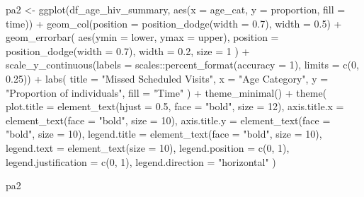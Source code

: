 \documentclass[
  letterpaper,
  DIV=11,
  numbers=noendperiod]{scrartcl}
\newenvironment{Shaded}{\begin{snugshade}}{\end{snugshade}}
\newcommand{\AttributeTok}[1]{\textcolor[rgb]{0.40,0.45,0.13}{#1}}
\newcommand{\DecValTok}[1]{\textcolor[rgb]{0.68,0.00,0.00}{#1}}
\newcommand{\FloatTok}[1]{\textcolor[rgb]{0.68,0.00,0.00}{#1}}
\newcommand{\FunctionTok}[1]{\textcolor[rgb]{0.28,0.35,0.67}{#1}}
\newcommand{\NormalTok}[1]{\textcolor[rgb]{0.00,0.23,0.31}{#1}}
\newcommand{\OtherTok}[1]{\textcolor[rgb]{0.00,0.23,0.31}{#1}}
\newcommand{\SpecialCharTok}[1]{\textcolor[rgb]{0.37,0.37,0.37}{#1}}
\newcommand{\StringTok}[1]{\textcolor[rgb]{0.13,0.47,0.30}{#1}}
\begin{document}
\begin{Shaded}
\begin{Highlighting}[]
\NormalTok{pa2 }\OtherTok{\textless{}{-}} \FunctionTok{ggplot}\NormalTok{(df\_age\_hiv\_summary, }\FunctionTok{aes}\NormalTok{(}\AttributeTok{x =}\NormalTok{ age\_cat, }\AttributeTok{y =}\NormalTok{ proportion, }\AttributeTok{fill =}\NormalTok{ time)) }\SpecialCharTok{+}
  \FunctionTok{geom\_col}\NormalTok{(}\AttributeTok{position =} \FunctionTok{position\_dodge}\NormalTok{(}\AttributeTok{width =} \FloatTok{0.7}\NormalTok{), }\AttributeTok{width =} \FloatTok{0.5}\NormalTok{) }\SpecialCharTok{+}
  \FunctionTok{geom\_errorbar}\NormalTok{(}
    \FunctionTok{aes}\NormalTok{(}\AttributeTok{ymin =}\NormalTok{ lower, }\AttributeTok{ymax =}\NormalTok{ upper),}
    \AttributeTok{position =} \FunctionTok{position\_dodge}\NormalTok{(}\AttributeTok{width =} \FloatTok{0.7}\NormalTok{),}
    \AttributeTok{width =} \FloatTok{0.2}\NormalTok{,}
    \AttributeTok{size =} \DecValTok{1}
\NormalTok{  ) }\SpecialCharTok{+}
  \FunctionTok{scale\_y\_continuous}\NormalTok{(}\AttributeTok{labels =}\NormalTok{ scales}\SpecialCharTok{::}\FunctionTok{percent\_format}\NormalTok{(}\AttributeTok{accuracy =} \DecValTok{1}\NormalTok{), }\AttributeTok{limits =} \FunctionTok{c}\NormalTok{(}\DecValTok{0}\NormalTok{, }\FloatTok{0.25}\NormalTok{)) }\SpecialCharTok{+}
  \FunctionTok{labs}\NormalTok{(}
    \AttributeTok{title =} \StringTok{"Missed Scheduled Visits"}\NormalTok{,}
    \AttributeTok{x =} \StringTok{"Age Category"}\NormalTok{,}
    \AttributeTok{y =} \StringTok{"Proportion of individuals"}\NormalTok{,}
    \AttributeTok{fill =} \StringTok{"Time"}
\NormalTok{  ) }\SpecialCharTok{+}
  \FunctionTok{theme\_minimal}\NormalTok{() }\SpecialCharTok{+}
  \FunctionTok{theme}\NormalTok{(}
    \AttributeTok{plot.title =} \FunctionTok{element\_text}\NormalTok{(}\AttributeTok{hjust =} \FloatTok{0.5}\NormalTok{, }\AttributeTok{face =} \StringTok{"bold"}\NormalTok{, }\AttributeTok{size =} \DecValTok{12}\NormalTok{),}
    \AttributeTok{axis.title.x =} \FunctionTok{element\_text}\NormalTok{(}\AttributeTok{face =} \StringTok{"bold"}\NormalTok{, }\AttributeTok{size =} \DecValTok{10}\NormalTok{),}
    \AttributeTok{axis.title.y =} \FunctionTok{element\_text}\NormalTok{(}\AttributeTok{face =} \StringTok{"bold"}\NormalTok{, }\AttributeTok{size =} \DecValTok{10}\NormalTok{),}
    \AttributeTok{legend.title =} \FunctionTok{element\_text}\NormalTok{(}\AttributeTok{face =} \StringTok{"bold"}\NormalTok{, }\AttributeTok{size =} \DecValTok{10}\NormalTok{),}
    \AttributeTok{legend.text =} \FunctionTok{element\_text}\NormalTok{(}\AttributeTok{size =} \DecValTok{10}\NormalTok{),}
    \AttributeTok{legend.position =} \FunctionTok{c}\NormalTok{(}\DecValTok{0}\NormalTok{, }\DecValTok{1}\NormalTok{),}
    \AttributeTok{legend.justification =} \FunctionTok{c}\NormalTok{(}\DecValTok{0}\NormalTok{, }\DecValTok{1}\NormalTok{),}
    \AttributeTok{legend.direction =} \StringTok{"horizontal"}
\NormalTok{  )}

\NormalTok{pa2}
\end{Highlighting}
\end{Shaded}
\end{document}
